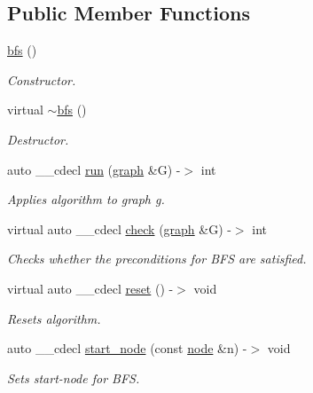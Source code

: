 \subsection*{Public Member Functions}
\begin{DoxyCompactItemize}
\item 
\mbox{\label{classbfs_a16543f987ad29303e7d13650d5463605}} 
\mbox{\hyperlink{classbfs_a16543f987ad29303e7d13650d5463605}{bfs}} ()
\begin{DoxyCompactList}\small\item\em Constructor. \end{DoxyCompactList}\item 
\mbox{\label{classbfs_a6999a08f3cee2b54f07ffeac0d484df1}} 
virtual \mbox{\hyperlink{classbfs_a6999a08f3cee2b54f07ffeac0d484df1}{$\sim$bfs}} ()
\begin{DoxyCompactList}\small\item\em Destructor. \end{DoxyCompactList}\item 
auto \+\_\+\+\_\+cdecl \mbox{\hyperlink{classbfs_aaeebfe1628febd8d4ba658efc0ef51ed}{run}} (\mbox{\hyperlink{classgraph}{graph}} \&G) -\/$>$ int
\begin{DoxyCompactList}\small\item\em Applies algorithm to graph g. \end{DoxyCompactList}\item 
virtual auto \+\_\+\+\_\+cdecl \mbox{\hyperlink{classbfs_a57bc562775d63c4bbec63ee403e0fde7}{check}} (\mbox{\hyperlink{classgraph}{graph}} \&G) -\/$>$ int
\begin{DoxyCompactList}\small\item\em Checks whether the preconditions for B\+FS are satisfied. \end{DoxyCompactList}\item 
virtual auto \+\_\+\+\_\+cdecl \mbox{\hyperlink{classbfs_a9f93abba43ea1fa130a4c26b32793f2f}{reset}} () -\/$>$ void
\begin{DoxyCompactList}\small\item\em Resets algorithm. \end{DoxyCompactList}\item 
auto \+\_\+\+\_\+cdecl \mbox{\hyperlink{classbfs_aecb495d5cc06f8a0f89239d70668abba}{start\+\_\+node}} (const \mbox{\hyperlink{classnode}{node}} \&n) -\/$>$ void
\begin{DoxyCompactList}\small\item\em Sets start-\/node for B\+FS. \end{DoxyCompactList}\item 

\end{DoxyCompactItemize}
